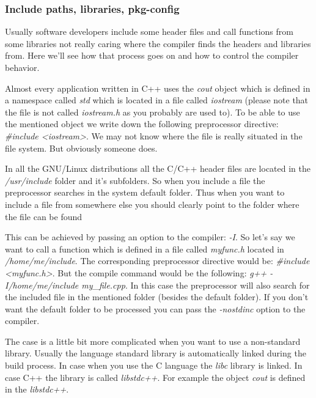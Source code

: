 \subsubsection{Include paths, libraries, pkg-config}
\label {inc_lib_pkgconfig}
Usually software developers include some header files and call functions from some libraries not really caring where the compiler finds the headers and libraries from. Here we'll see how that process goes on and how to control the compiler behavior.

Almost every application written in C++ uses the \textit { cout} object which is defined in a namespace called \textit { std} which is located in a file called \textit { iostream} (please note that the file is not called \textit { iostream.h} as you probably are used to). To be able to use the mentioned object we write down the following preprocessor directive: \textit { \#include <iostream>}. We may not know where the file is really situated in the file system. But obviously someone does. 

In all the GNU/Linux distributions all the C/C++ header files are located in the \textit { /usr/include} folder and it's subfolders. So when you include a file the preprocessor searches in the system default folder. Thus when you want to include a file from somewhere else you should clearly point to the folder where the file can be found

This can be achieved by passing an option to the compiler: \textit { -I}. So let's say we want to call a function which is defined in a file called \textit { myfunc.h} located in \textit { /home/me/include}. The corresponding preprocessor directive would be: \textit { \#include <myfunc.h>}. But the compile command would be the following: \textit { g++ -I/home/me/include my\_file.cpp}. In this case the preprocessor will also search for the included file in the mentioned folder (besides the default folder). If you don't want the default folder to be processed you can pass the \textit { -nostdinc} option to the compiler.

The case is a little bit more complicated when you want to use a non-standard library. Usually the language standard library is automatically linked during the build process. In case when you use the C language the \textit { libc} library is linked. In case C++ the library is called \textit { libstdc++}. For example the object \textit { cout} is defined in the \textit { libstdc++}.

